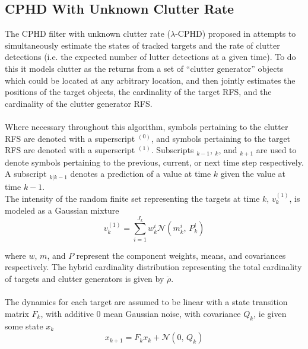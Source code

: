 \documentclass{article}
\begin{document}
\subsection{CPHD With Unknown Clutter Rate}
The CPHD filter with unknown clutter rate ($\lambda$-CPHD) proposed in \cite{cphd} attempts to simultaneously estimate the states of tracked targets and the rate of clutter detections (i.e. the expected number of lutter detections at a given time). To do this it models clutter as the returns from a set of ``clutter generator'' objects which could be located at any arbitrary location, and then jointly estimates the positions of the target objects, the cardinality of the target RFS, and the cardinality of the clutter generator RFS. \\
\\
Where necessary throughout this algorithm, symbols pertaining to the clutter RFS are denoted with a superscript $^{(0)}$, and symbols pertaining to the target RFS are denoted with a superscript $^{(1)}$. Subscripts $_{k-1}$, $_k$, and $_{k+1}$ are used to denote symbols pertaining to the previous, current, or next time step respectively. A subscript $_{k|k-1}$ denotes a prediction of a value at time $k$ given the value at time $k-1$.
\\
The intensity of the random finite set representing the targets at time $k$, $v^{(1)}_k$, is modeled as a Gaussian mixture
\begin{equation}
  \label{eq:vk-1}
  v^{(1)}_k = \sum_{i = 1}^{J_k}w_k^i \mathcal{N}(m_k^i,\,P_k^i)
\end{equation}

where $w$, $m$, and $P$ represent the component weights, means, and covariances respectively. The hybrid cardinality distribution representing the total cardinality of targets and clutter generators is given by $\ddot{\rho}$. \\
\\
The dynamics for each target are assumed to be linear with a state transition matrix $F_k$, with additive 0 mean Gaussian noise, with covariance $Q_k$, ie given some state $x_k$
\begin{equation}
  \label{eq:tgt_dynamics}
  x_{k+1} = F_kx_k + \mathcal{N}(0,\,Q_k)
\end{equation}
\end{document}
